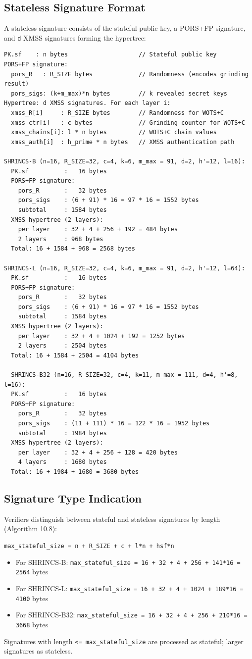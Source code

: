 \subsection{Stateless Signature Format}
A stateless signature consists of the stateful public key, a PORS+FP signature, and \texttt{d} XMSS signatures forming the hypertree:
\begin{verbatim}
PK.sf    : n bytes                    // Stateful public key
PORS+FP signature:
  pors_R   : R_SIZE bytes             // Randomness (encodes grinding result)
  pors_sigs: (k+m_max)*n bytes        // k revealed secret keys
Hypertree: d XMSS signatures. For each layer i:
  xmss_R[i]     : R_SIZE bytes        // Randomness for WOTS+C
  xmss_ctr[i]   : c bytes             // Grinding counter for WOTS+C
  xmss_chains[i]: l * n bytes         // WOTS+C chain values
  xmss_auth[i]  : h_prime * n bytes   // XMSS authentication path

SHRINCS-B (n=16, R_SIZE=32, c=4, k=6, m_max = 91, d=2, h'=12, l=16):
  PK.sf          :   16 bytes
  PORS+FP signature:
    pors_R       :   32 bytes
    pors_sigs    : (6 + 91) * 16 = 97 * 16 = 1552 bytes
    subtotal     : 1584 bytes
  XMSS hypertree (2 layers):
    per layer    : 32 + 4 + 256 + 192 = 484 bytes
    2 layers     : 968 bytes
  Total: 16 + 1584 + 968 = 2568 bytes

SHRINCS-L (n=16, R_SIZE=32, c=4, k=6, m_max = 91, d=2, h'=12, l=64):
  PK.sf          :   16 bytes
  PORS+FP signature:
    pors_R       :   32 bytes
    pors_sigs    : (6 + 91) * 16 = 97 * 16 = 1552 bytes
    subtotal     : 1584 bytes
  XMSS hypertree (2 layers):
    per layer    : 32 + 4 + 1024 + 192 = 1252 bytes
    2 layers     : 2504 bytes
  Total: 16 + 1584 + 2504 = 4104 bytes

  SHRINCS-B32 (n=16, R_SIZE=32, c=4, k=11, m_max = 111, d=4, h'=8, l=16):
  PK.sf          :   16 bytes
  PORS+FP signature:
    pors_R       :   32 bytes
    pors_sigs    : (11 + 111) * 16 = 122 * 16 = 1952 bytes
    subtotal     : 1984 bytes
  XMSS hypertree (2 layers):
    per layer    : 32 + 4 + 256 + 128 = 420 bytes
    4 layers     : 1680 bytes
  Total: 16 + 1984 + 1680 = 3680 bytes
\end{verbatim}

\subsection{Signature Type Indication}

Verifiers distinguish between stateful and stateless signatures by length (Algorithm 10.8):
\begin{center}
    \texttt{max\_stateful\_size = n + R\_SIZE + c + l*n + hsf*n}
\end{center}
\begin{itemize}
    \item For SHRINCS-B: \texttt{max\_stateful\_size = 16 + 32 + 4 + 256 + 141*16 = 2564} bytes
    \item For SHRINCS-L: \texttt{max\_stateful\_size = 16 + 32 + 4 + 1024 + 189*16 = 4100} bytes
    \item For SHRINCS-B32: \texttt{max\_stateful\_size = 16 + 32 + 4 + 256 + 210*16 = 3668} bytes
\end{itemize}

Signatures with length \texttt{<= max\_stateful\_size} are processed as stateful; larger signatures as stateless.